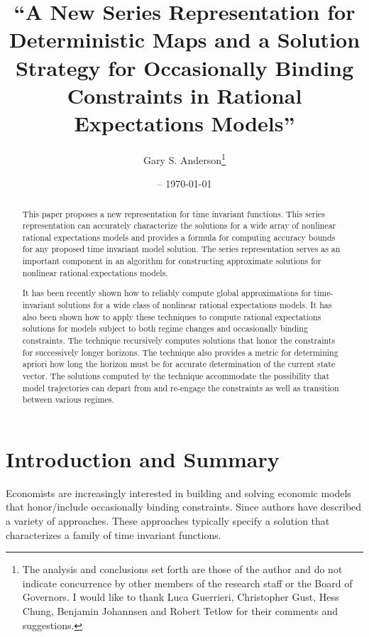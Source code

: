 \documentclass[12pt]{article}
\title{``A New Series Representation for Deterministic Maps and
a Solution Strategy for Occasionally Binding Constraints in Rational Expectations Models''}
\date{\currenttime -- \today }
\author{Gary S. Anderson\thanks{The analysis and conclusions set forth are those of the author and do not indicate concurrence by other members of the research staff or the Board of Governors. I would like to thank Luca Guerrieri, Christopher Gust, Hess Chung, Benjamin Johannsen  and Robert Tetlow for their comments and suggestions. }}
\begin{document}
\maketitle

\begin{abstract}


 
This paper proposes a new representation for time invariant functions.
This series representation 
can accurately characterize the solutions for a 
wide array of nonlinear rational expectations models 
and provides a formula
for computing accuracy bounds for any proposed time invariant model solution.
The series representation serves as an important component in an algorithm 
for constructing approximate solutions for nonlinear rational expectations
models.


It has been recently shown how to reliably compute global approximations for time-invariant solutions for a wide class of nonlinear rational expectations models. It has also been shown how to apply these techniques to compute rational expectations solutions for models subject to both regime changes and occasionally binding constraints.  The technique recursively computes  solutions that honor the constraints for successively longer horizons. The technique also provides a metric for determining apriori how long the horizon must be for accurate determination of the current state vector. The solutions computed by the technique accommodate the possibility that model trajectories can depart from and re-engage the constraints as well as transition between various regimes.



\end{abstract}

 \newpage
 \tableofcontents
 \newpage


\section{Introduction and Summary}

Economists are increasingly interested in building and solving 
economic models that honor/include occasionally binding constraints.
Since \cite{Christiano2000} authors have described a 
variety of approaches.\cite{holden15:_exist_dsge,guerrieri15:_occbin,benigno09,hintermaier10,brumm10,nakov08,haefke98,nakata12,gordon11,billi11,Hintermaier2010,Guerrieri2015}
These approaches typically specify a solution that characterizes a family of
time invariant functions.
\end{document}
